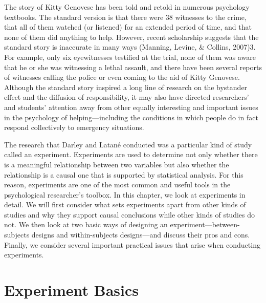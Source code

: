 \color{fgcolor}\begin{kframe}




The story of Kitty Genovese has been told and retold in numerous psychology textbooks. The standard version is that there were 38 witnesses to the crime, that all of them watched (or listened) for an extended period of time, and that none of them did anything to help. However, recent scholarship suggests that the standard story is inaccurate in many ways (Manning, Levine, \& Collins, 2007)3. For example, only six eyewitnesses testified at the trial, none of them was aware that he or she was witnessing a lethal assault, and there have been several reports of witnesses calling the police or even coming to the aid of Kitty Genovese. Although the standard story inspired a long line of research on the bystander effect and the
 diffusion of responsibility, it may also have directed researchers' and students' attention away from other equally interesting and important issues in the psychology of helping---including the conditions in which people do in fact respond collectively to emergency situations.

\end{kframe}


The research that Darley and Latané conducted was a particular kind of study called an experiment. Experiments are used to determine not only whether there is a meaningful relationship between two variables but also whether the relationship is a causal one that is supported by statistical analysis. For this reason, experiments are one of the most common and useful tools in the psychological researcher's toolbox. In this chapter, we look at experiments in detail. We will first consider what sets experiments apart from other kinds of studies and why they support causal conclusions while other kinds of studies do not. We then look at two basic ways of designing an experiment---between-subjects designs and within-subjects designs---and discuss their pros and cons. Finally, we consider several important practical issues that arise when conducting experiments.

\section{Experiment Basics}
 
